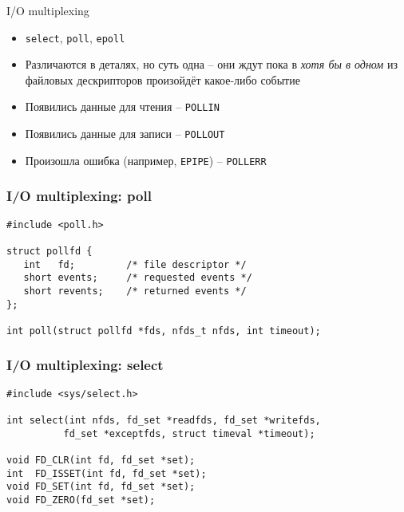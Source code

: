 \documentclass[10pt,pdf,hyperref={unicode}]{beamer}
\begin{document}
\begin{frame}{I/O multiplexing}
\begin{itemize}
    \item \texttt{select}, \texttt{poll}, \texttt{epoll}
    \item Различаются в деталях, но суть одна -- они ждут пока в \emph{хотя бы в одном} из файловых дескрипторов произойдёт какое-либо событие
    \item Появились данные для чтения -- \texttt{POLLIN}
    \item Появились данные для записи -- \texttt{POLLOUT}
    \item Произошла ошибка (например, \texttt{EPIPE}) -- \texttt{POLLERR}
\end{itemize}
\end{frame}

\begin{frame}[fragile]
\frametitle{I/O multiplexing: poll}
\begin{center}
\begin{minipage}{0.95\textwidth}
\begin{verbatim}
#include <poll.h>

struct pollfd {
   int   fd;         /* file descriptor */
   short events;     /* requested events */
   short revents;    /* returned events */
};

int poll(struct pollfd *fds, nfds_t nfds, int timeout);
\end{verbatim}
\end{minipage}
\end{center}
\end{frame}

\begin{frame}[fragile]
\frametitle{I/O multiplexing: select}
\begin{center}
\begin{minipage}{0.95\textwidth}
\begin{verbatim}
#include <sys/select.h>

int select(int nfds, fd_set *readfds, fd_set *writefds,
          fd_set *exceptfds, struct timeval *timeout);

void FD_CLR(int fd, fd_set *set);
int  FD_ISSET(int fd, fd_set *set);
void FD_SET(int fd, fd_set *set);
void FD_ZERO(fd_set *set);

\end{verbatim}
\end{minipage}
\end{center}
\end{frame}
\end{document}
